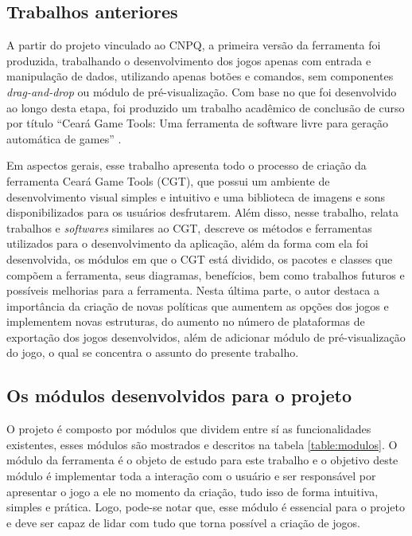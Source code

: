 \documentclass[12pt,twoside,openright,a4paper,english,brazil,sumario=tradicional]{abntex2}
\begin{document}
\subsection{Trabalhos anteriores}
A partir do projeto vinculado ao CNPQ, a primeira versão da ferramenta foi produzida, trabalhando o desenvolvimento dos jogos apenas com entrada e manipulação de dados, utilizando apenas botões e comandos, sem componentes \emph{drag-and-drop} ou módulo de pré-visualização. Com base no que foi desenvolvido ao longo desta etapa, foi produzido um trabalho acadêmico de conclusão de curso por título “Ceará Game Tools: Uma ferramenta de software livre para geração automática de games” \cite{monografia:aquino}.

Em aspectos gerais, esse trabalho apresenta todo o processo de criação da ferramenta Ceará Game Tools (CGT), que possui um ambiente de desenvolvimento visual simples e intuitivo e uma biblioteca de imagens e sons disponibilizados para os usuários desfrutarem. Além disso, nesse trabalho, relata trabalhos e \emph{softwares} similares ao CGT, descreve os métodos e ferramentas utilizados para o desenvolvimento da aplicação, além da forma com ela foi desenvolvida, os módulos em que o CGT está dividido, os pacotes e classes que compõem a ferramenta, seus diagramas, benefícios, bem como trabalhos futuros e possíveis melhorias para a ferramenta. Nesta última parte, o autor destaca a importância da criação de novas políticas que aumentem as opções dos jogos e implementem novas estruturas, do aumento no número de plataformas de exportação dos jogos desenvolvidos, além de adicionar módulo de pré-visualização do jogo, o qual se concentra o assunto do presente trabalho.

\subsection{Os módulos desenvolvidos para o projeto}
O projeto é composto por módulos que dividem entre sí as funcionalidades existentes, esses módulos são mostrados e descritos na tabela \ref{table:modulos}. O módulo da ferramenta é o objeto de estudo para este trabalho e o objetivo deste módulo é implementar toda a interação com o usuário e ser responsável por apresentar o jogo a ele no momento da criação, tudo isso de forma intuitiva, simples e prática. Logo, pode-se notar que, esse módulo é essencial para o projeto e deve ser capaz de lidar com tudo que torna possível a criação de jogos.
\end{document}
